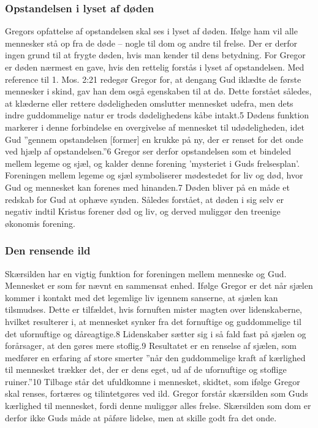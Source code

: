 \subsubsection{Opstandelsen i lyset af døden}
Gregors opfattelse af opstandelsen skal ses i lyset af døden. Ifølge ham vil alle mennesker stå op fra de døde -- nogle til dom og andre til frelse. Der er derfor ingen grund til at frygte døden, hvis man kender til dens betydning. For Gregor er døden nærmest en gave, hvis den rettelig forstås i lyset af opstandelsen. Med reference til 1. Mos. 2:21 redegør Gregor for, at dengang Gud iklædte de første mennesker i skind, gav han dem osgå egenskaben til at dø. Dette forstået således, at klæderne eller rettere dødeligheden omslutter mennesket udefra, men dets indre guddommelige natur er trods dødelighedens kåbe intakt.5 Dødens funktion markerer i denne forbindelse en overgivelse af mennesket til udødeligheden, idet Gud ”gennem opstandelsen [former] en krukke på ny, der er renset for det onde ved hjælp af opstandelsen.”6 Gregor ser derfor opstandelsen som et bindeled mellem legeme og sjæl, og kalder denne forening 'mysteriet i Guds frelsesplan'. Foreningen mellem legeme og sjæl symboliserer mødestedet for liv og død, hvor Gud og mennesket kan forenes med hinanden.7 Døden bliver på en måde et redskab for Gud at ophæve synden. Således forstået, at døden i sig selv er negativ indtil Kristus forener død og liv, og derved muliggør den treenige økonomis forening.

\subsubsection{Den rensende ild}
Skærsilden har en vigtig funktion for foreningen mellem menneske og Gud. Mennesket er som før nævnt en sammensat enhed. Ifølge Gregor er det når sjælen kommer i kontakt med det legemlige liv igennem sanserne, at sjælen kan tilsmudses. Dette er tilfældet, hvis fornuften mister magten over lidenskaberne, hvilket resulterer i, at mennesket synker fra det fornuftige og guddommelige til det ufornuftige og dåreagtige.8 Lidenskaber sætter sig i så fald fast på sjælen og forårsager, at den gøres mere stoflig.9 Resultatet er en renselse af sjælen, som medfører en erfaring af store smerter ”når den guddommelige kraft af kærlighed til mennesket trækker det, der er dens eget, ud af de ufornuftige og stoflige ruiner.”10 Tilbage står det ufuldkomne i mennesket, skidtet, som ifølge Gregor skal renses, fortæres og tilintetgøres ved ild. Gregor forstår skærsilden som Guds kærlighed til mennesket, fordi denne muliggør alles frelse. Skærsilden som dom er derfor ikke Guds måde at påføre lidelse, men at skille godt fra det onde.

